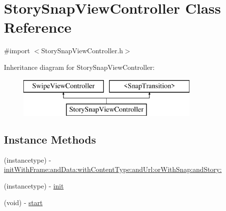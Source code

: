 \hypertarget{interface_story_snap_view_controller}{}\section{Story\+Snap\+View\+Controller Class Reference}
\label{interface_story_snap_view_controller}


{\ttfamily \#import $<$Story\+Snap\+View\+Controller.\+h$>$}

Inheritance diagram for Story\+Snap\+View\+Controller\+:\begin{figure}[H]
\begin{center}
\leavevmode
\includegraphics[height=2.000000cm]{interface_story_snap_view_controller}
\end{center}
\end{figure}
\subsection*{Instance Methods}
\begin{DoxyCompactItemize}
\item 
(instancetype) -\/ \hyperlink{interface_story_snap_view_controller_a68cc9ae68e9c4c500b5f1a10460e592c}{init\+With\+Frame\+:and\+Data\+:with\+Content\+Type\+:and\+Url\+:or\+With\+Snap\+:and\+Story\+:}
\item 
(instancetype) -\/ \hyperlink{interface_story_snap_view_controller_a2a833b5127655faabdcd388e295bbeeb}{init}
\item 
(void) -\/ \hyperlink{interface_story_snap_view_controller_a200191dfbc2ff52cd6d279581ceb1d1a}{start}
\end{DoxyCompactItemize}
